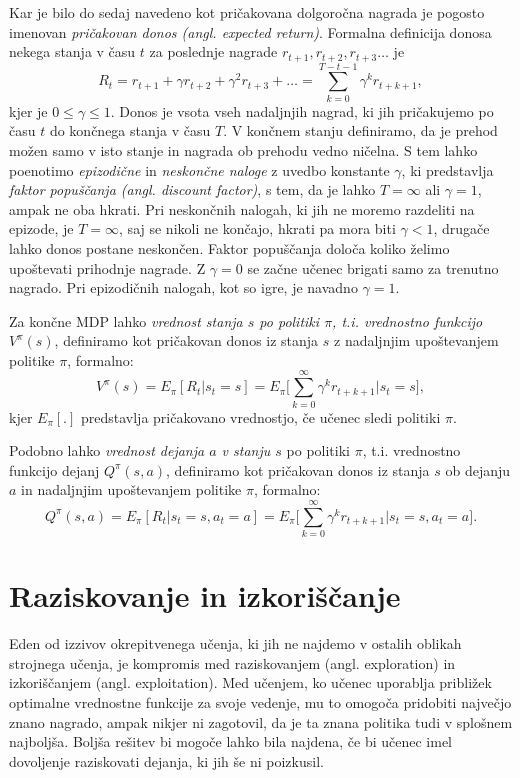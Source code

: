 \documentclass[a4paper, oneside, 12pt]{report}
\begin{document}
Kar je bilo do sedaj navedeno kot pričakovana dolgoročna nagrada je pogosto imenovan {\em pričakovan donos (angl. expected return)}. Formalna definicija donosa nekega stanja v času $t$ za poslednje nagrade $r_{t+1}, r_{t+2}, r_{t+3} \dots$ je
\begin{equation}
R_t = r_{t+1} + \gamma r_{t+2} + \gamma^2 r_{t+3} + \dots = \sum_{k=0}^{T-t-1} \gamma^k r_{t+k+1},
\end{equation}
kjer je $0 \le \gamma \le 1$. Donos je vsota vseh nadaljnjih nagrad, ki jih pričakujemo po času $t$ do končnega stanja v času $T$. V končnem stanju definiramo, da je prehod možen samo v isto stanje in nagrada ob prehodu vedno ničelna. S tem lahko poenotimo {\em epizodične} in {\em neskončne naloge} z uvedbo konstante $\gamma$, ki predstavlja {\em faktor popuščanja (angl. discount factor)}, s tem, da je lahko $T = \infty$ ali $\gamma = 1$, ampak ne oba hkrati. Pri neskončnih nalogah, ki jih ne moremo razdeliti na epizode, je $T = \infty$, saj se nikoli ne končajo, hkrati pa mora biti $\gamma < 1$, drugače lahko donos postane neskončen. Faktor popuščanja določa koliko želimo upoštevati prihodnje nagrade. Z $\gamma = 0$ se začne učenec brigati samo za trenutno nagrado. Pri epizodičnih nalogah, kot so igre, je navadno $\gamma = 1$.

Za končne MDP lahko {\em vrednost stanja $s$ po politiki $\pi$, t.i. vrednostno funkcijo $V^\pi(s)$}, definiramo kot pričakovan donos iz stanja $s$ z nadaljnjim upoštevanjem politike $\pi$, formalno:
\begin{equation}
V^\pi(s) = E_\pi[R_t | s_t = s] = E_\pi\Bigg[\sum_{k=0}^\infty \gamma^k r_{t+k+1} \Bigg| s_t = s\Bigg],
\end{equation}
kjer $E_\pi[.]$ predstavlja pričakovano vrednostjo, če učenec sledi politiki $\pi$.

Podobno lahko {\em vrednost dejanja $a$ v stanju $s$} po politiki $\pi$, t.i. vrednostno funkcijo dejanj $Q^\pi(s, a)$, definiramo kot pričakovan donos iz stanja $s$ ob dejanju $a$ in nadaljnjim upoštevanjem politike $\pi$, formalno:
\begin{equation}
Q^\pi(s, a) = E_\pi[R_t | s_t = s, a_t = a] = E_\pi\Bigg[\sum_{k=0}^\infty \gamma^k r_{t+k+1} \Bigg| s_t = s, a_t = a\Bigg].
\end{equation}

\section{Raziskovanje in izkoriščanje}
Eden od izzivov okrepitvenega učenja, ki jih ne najdemo v ostalih oblikah strojnega učenja, je kompromis med raziskovanjem (angl. exploration) in izkoriščanjem (angl. exploitation). Med učenjem, ko učenec uporablja približek optimalne vrednostne funkcije za svoje vedenje, mu to omogoča pridobiti največjo znano nagrado, ampak nikjer ni zagotovil, da je ta znana politika tudi v splošnem najboljša. Boljša rešitev bi mogoče lahko bila najdena, če bi učenec imel dovoljenje raziskovati dejanja, ki jih še ni poizkusil.
\end{document}
